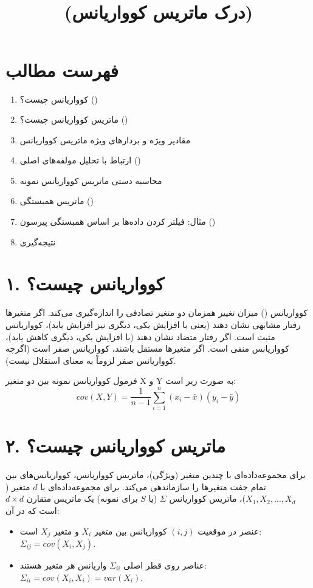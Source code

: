 \documentclass{article}
\title{\lr{Understanding the Covariance Matrix} \\ (درک ماتریس کوواریانس)}
\author{}
\date{}
\begin{document}
\maketitle

\section*{فهرست مطالب}
\begin{enumerate}
    \item کوواریانس چیست؟ ()
    \item ماتریس کوواریانس چیست؟ ()
    \item مقادیر ویژه و بردارهای ویژه ماتریس کوواریانس
    \item ارتباط با تحلیل مولفه‌های اصلی ()
    \item محاسبه دستی ماتریس کوواریانس نمونه
    \item ماتریس همبستگی ()
    \item مثال: فیلتر کردن داده‌ها بر اساس همبستگی پیرسون ()
    \item نتیجه‌گیری
\end{enumerate}

\newpage

\section*{۱. کوواریانس چیست؟}
کوواریانس () میزان تغییر همزمان دو متغیر تصادفی را اندازه‌گیری می‌کند. اگر متغیرها رفتار مشابهی نشان دهند (یعنی با افزایش یکی، دیگری نیز افزایش یابد)، کوواریانس مثبت است. اگر رفتار متضاد نشان دهند (با افزایش یکی، دیگری کاهش یابد)، کوواریانس منفی است. اگر متغیرها مستقل باشند، کوواریانس صفر است (اگرچه کوواریانس صفر لزوماً به معنای استقلال نیست).

فرمول کوواریانس نمونه بین دو متغیر X و Y به صورت زیر است:
\[
cov(X,Y) = \frac{1}{n-1} \sum_{i=1}^n (x_i - \bar{x})(y_i - \bar{y})
\]

\section*{۲. ماتریس کوواریانس چیست؟}
برای مجموعه‌داده‌ای با چندین متغیر (ویژگی)، ماتریس کوواریانس، کوواریانس‌های بین تمام جفت متغیرها را سازماندهی می‌کند. برای مجموعه‌داده‌ای با $d$ متغیر ($X_1, X_2, \dots, X_d$)، ماتریس کوواریانس $\Sigma$ (یا $S$ برای نمونه) یک ماتریس متقارن $d \times d$ است که در آن:
\begin{itemize}
    \item عنصر در موقعیت $(i, j)$ کوواریانس بین متغیر $X_i$ و متغیر $X_j$ است: $\Sigma_{ij} = cov(X_i, X_j)$.
    \item عناصر روی قطر اصلی $\Sigma_{ii}$ واریانس هر متغیر هستند: $\Sigma_{ii} = cov(X_i, X_i) = var(X_i)$.
\end{itemize}
\end{document}
